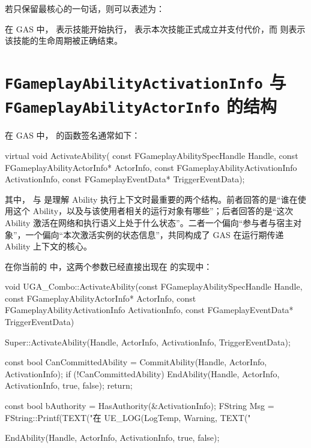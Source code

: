 若只保留最核心的一句话，则可以表述为：
\begin{marker}
	在 GAS 中， 表示技能开始执行， 表示本次技能正式成立并支付代价，而  则表示该技能的生命周期被正确结束。
\end{marker}


\section{\texttt{FGameplayAbilityActivationInfo} 与 \texttt{FGameplayAbilityActorInfo} 的结构}

在 GAS 中， 的函数签名通常如下：
\begin{code}
	virtual void ActivateAbility(
	const FGameplayAbilitySpecHandle Handle,
	const FGameplayAbilityActorInfo* ActorInfo,
	const FGameplayAbilityActivationInfo ActivationInfo,
	const FGameplayEventData* TriggerEventData);
\end{code}

其中， 与  是理解 Ability 执行上下文时最重要的两个结构。前者回答的是“谁在使用这个 Ability，以及与该使用者相关的运行对象有哪些”；后者回答的是“这次 Ability 激活在网络和执行语义上处于什么状态”。二者一个偏向“参与者与宿主对象”，一个偏向“本次激活实例的状态信息”，共同构成了 GAS 在运行期传递 Ability 上下文的核心。

在你当前的  中，这两个参数已经直接出现在  的实现中：

\begin{code}
	void UGA_Combo::ActivateAbility(const FGameplayAbilitySpecHandle Handle, const FGameplayAbilityActorInfo* ActorInfo, const FGameplayAbilityActivationInfo ActivationInfo, 	const FGameplayEventData* TriggerEventData)
	{
		Super::ActivateAbility(Handle, ActorInfo, ActivationInfo, TriggerEventData);
		
		const bool CanCommittedAbility = CommitAbility(Handle, ActorInfo, ActivationInfo);
		if (!CanCommittedAbility)
		{
			EndAbility(Handle, ActorInfo, ActivationInfo, true, false);
			return;
		}
		
		const bool bAuthority = HasAuthority(&ActivationInfo);
		FString Msg = FString::Printf(TEXT("在%
		UE_LOG(LogTemp, Warning, TEXT("%
		
		EndAbility(Handle, ActorInfo, ActivationInfo, true, false);
	}
\end{code}

